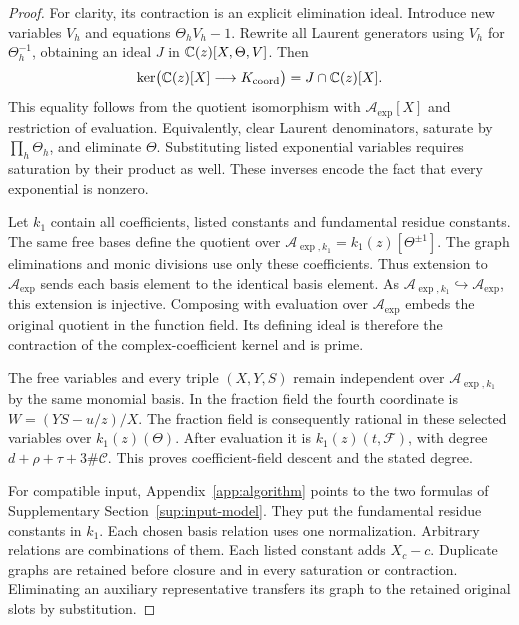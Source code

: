 \begin{proof}
For clarity, its contraction is an explicit elimination ideal. Introduce
new variables $V_h$ and equations $\Theta_hV_h-1$. Rewrite all Laurent
generators using $V_h$ for $\Theta_h^{-1}$, obtaining an ideal $J$ in
$\mathbb{C}(z)[X,\Theta,V]$. Then
\[
 \ker\bigl(\mathbb{C}(z)[X]\longrightarrow K_{\rm coord}\bigr)
   =J\cap\mathbb{C}(z)[X].
\]
This equality follows from the quotient isomorphism with $\mathscr A_{\exp}[X]$ and
restriction of evaluation. Equivalently, clear Laurent denominators,
saturate by $\prod_h\Theta_h$, and eliminate $\Theta$. Substituting listed
exponential variables requires saturation by their product as well.
These inverses encode the fact that every exponential is nonzero.

Let $k_1$ contain all coefficients, listed constants and fundamental residue constants.
The same free bases define the quotient over
$\mathscr A_{\exp,k_1}=k_1(z)[\Theta^{\pm1}]$.
The graph eliminations and monic divisions use only these coefficients.
Thus extension to $\mathscr A_{\exp}$ sends each basis element to the identical basis
element. As $\mathscr A_{\exp,k_1}\hookrightarrow \mathscr A_{\exp}$, this extension is injective.
Composing with evaluation over $\mathscr A_{\exp}$ embeds the original quotient in the
function field. Its defining ideal is therefore the contraction of the
complex-coefficient kernel and is prime.

The free variables and every triple $(X,Y,S)$ remain independent over
$\mathscr A_{\exp,k_1}$ by the same monomial basis. In the fraction field the fourth
coordinate is $W=(YS-u/z)/X$. The fraction field is consequently
rational in these selected variables over $k_1(z)(\Theta)$.
After evaluation it is $k_1(z)(t,\mathcal F)$, with degree
$d+\rho+\tau+3\#\mathcal C$. This proves coefficient-field descent
and the stated degree.

For compatible input, Appendix~\ref{app:algorithm} points to the two
formulas of Supplementary Section~\ref{sup:input-model}. They put the fundamental residue constants in
$k_1$. Each chosen basis relation uses one normalization. Arbitrary
relations are combinations of them. Each listed constant adds $X_c-c$.
Duplicate graphs are retained before closure and in every saturation or
contraction. Eliminating an auxiliary representative transfers its graph
to the retained original slots by substitution.
\end{proof}
